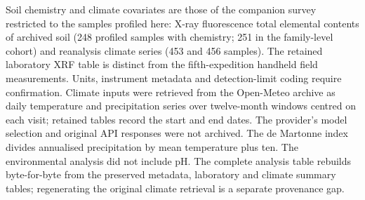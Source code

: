 \documentclass[11pt]{article}
\begin{document}
Soil chemistry and climate covariates are those of the companion survey restricted to the samples
profiled here: X-ray fluorescence total elemental contents of archived soil (248 profiled samples
with chemistry; 251 in the family-level cohort) and reanalysis climate series (453 and 456 samples).
The retained laboratory XRF table is distinct from the fifth-expedition handheld field measurements.
Units, instrument metadata and detection-limit coding require confirmation. Climate inputs were
retrieved from the Open-Meteo archive as daily temperature and precipitation series over twelve-month
windows centred on each visit; retained tables record the start and end dates. The provider's model
selection and original API responses were not archived. The de Martonne index divides annualised
precipitation by mean temperature plus ten. The environmental analysis did not include pH.
The complete analysis table rebuilds byte-for-byte from the preserved metadata, laboratory and
climate summary tables; regenerating the original climate retrieval is a separate provenance gap.
\end{document}
